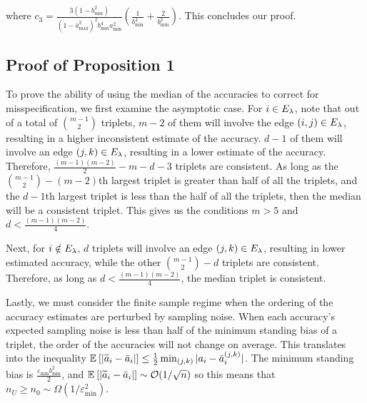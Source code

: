 where $c_3 = \frac{3(1 - b_{\min}^2)}{(1 - \bar{a}_{\max}^2)^2 b_{\min}^4 a_{\min}^2} \left(\frac{1}{b_{\min}^4} + \frac{2}{b_{\min}^2} \right)$. This concludes our proof.

\subsection{Proof of Proposition 1} \label{subsec:medians}

To prove the ability of using the median of the accuracies to correct for misspecification, we first examine the asymptotic case. For $i \in E_{\lambda}$, note that out of a total of ${m - 1 \choose 2}$ triplets, $m - 2$ of them will involve the edge $(i, j)\in E_{\lambda}$, resulting in a higher inconsistent estimate of the accuracy. $d - 1$ of them will involve an edge $(j, k) \in E_{\lambda}$, resulting in a lower estimate of the accuracy. Therefore, $\frac{(m - 1)(m - 2)}{2} - m - d - 3$ triplets are consistent. As long as the ${m - 1 \choose 2} - (m - 2)$th largest triplet is greater than half of all the triplets, and the $d - 1$th largest triplet is less than the half of all the triplets, then the median will be a consistent triplet. This gives us the conditions $m > 5$ and $d < \frac{(m - 1)(m - 2)}{4}$.

Next, for $i \notin E_{\lambda}$, $d$ triplets will involve an edge $(j, k) \in E_{\lambda}$, resulting in lower estimated accuracy, while the other ${m - 1 \choose 2} - d$ triplets are consistent. Therefore, as long as $d < \frac{(m - 1)(m - 2)}{4}$, the median triplet is consistent. 

Lastly, we must consider the finite sample regime when the ordering of the accuracy estimates are perturbed by sampling noise. When each accuracy's expected sampling noise is less than half of the minimum standing bias of a triplet, the order of the accuracies will not change on average. This translates into the inequality $\mathbb{E}_{}\left[|\widetilde{a}_i - \bar{a}_i|\right] \le \frac{1}{2} \min_{(j, k)}|a_i - \bar{a}_i^{(j, k)}|$. The minimum standing bias is $\frac{\varepsilon_{\min} b_{\min}^2}{2}$, and $\mathbb{E}_{}\left[|\widetilde{a}_i - \bar{a}_i|\right] \sim \mathcal{O}(1/\sqrt{n})$ so this means that $n_U \ge n_0 \sim \Omega(1/\varepsilon_{\min}^2)$.


